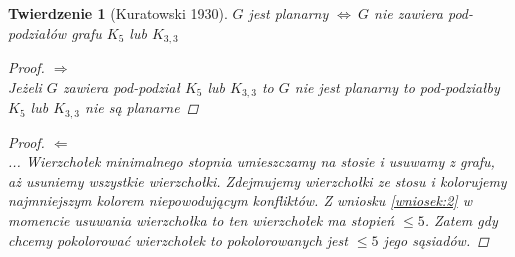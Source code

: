 \documentclass[12pt,a4paper]{article}
\newtheorem{tw}{Twierdzenie}
\theoremstyle{definition}
\begin{document}
\begin{tw}[Kuratowski 1930]
$G$ jest planarny $\Leftrightarrow~G$ nie zawiera pod-podziałów grafu $K_5$ lub $K_{3,3}$

\begin{proof}$\Rightarrow$\\
Jeżeli $G$ zawiera pod-podział $K_5$ lub $K_{3,3}$ to $G$ nie jest planarny to pod-podziałby $K_5$ lub $K_{3,3}$ nie są planarne
\end{proof}
\begin{proof}$\Leftarrow$\\
...
Wierzchołek minimalnego stopnia umieszczamy na stosie i usuwamy z grafu, aż usuniemy wszystkie wierzchołki. Zdejmujemy wierzchołki ze stosu i kolorujemy najmniejszym kolorem niepowodującym
konfliktów. Z wniosku \ref{wniosek:2} w momencie usuwania wierzchołka to ten wierzchołek ma stopień $\leqslant 5$. Zatem gdy chcemy pokolorować wierzchołek to pokolorowanych jest $\leqslant 5$ jego sąsiadów.
\end{proof}
\end{tw}
\end{document}
